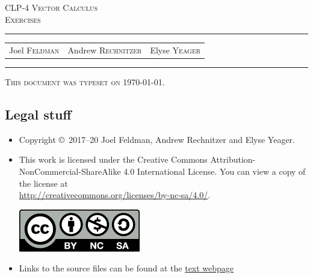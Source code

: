 \documentclass[12pt,letterpaper, openany]{book}
\begin{document}
\setcounter{page}{0}


\begin{titlepage} 
\begin{center} 
\textsc{\LARGE
CLP-4 Vector Calculus \\[2ex]
Exercises
}\\[2ex]

\vspace{5ex}
\hrule
\vspace{5ex}

\begin{tabular}{ccc}
\large  Joel \textsc{Feldman}  
& \large \qquad Andrew \textsc{Rechnitzer} 
&\large  \qquad Elyse \textsc{Yeager}
\end{tabular}

\end{center}
\vspace{2ex}
\hrule

\vfill
\textsc{This document was typeset on \today.}
\end{titlepage}

\subsection*{Legal stuff}
\begin{itemize}
 \item Copyright \copyright\ 2017--20 Joel Feldman, Andrew Rechnitzer and Elyse Yeager.

\item This work is licensed under the
Creative Commons Attribution-NonCommercial-ShareAlike 4.0 International
License. You can view a copy of the license at \\
\url{http://creativecommons.org/licenses/by-nc-sa/4.0/}.
\begin{center}
 \includegraphics{by-nc-sa.pdf}
\end{center}


\item Links to the source files can be found at the \href{http://www.math.ubc.ca/~CLP/index.html}{text webpage}
\end{itemize}

\newpage
\end{document}

